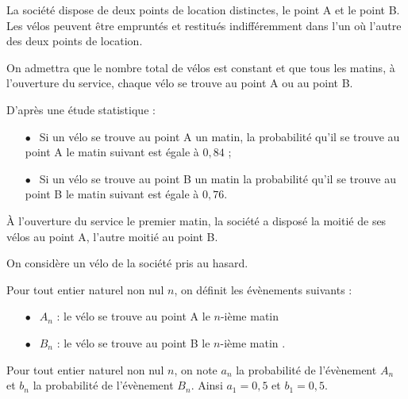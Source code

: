 \documentclass[10pt,a4paper]{article}
\begin{document}
La société dispose de deux points de location distinctes, le point A et le point B. Les vélos peuvent être empruntés et restitués indifféremment dans l'un où l'autre des deux points de location.

\smallskip

On admettra que le nombre total de vélos est constant et que tous les matins, à l'ouverture du service, chaque vélo se trouve au point A ou au point B.

\smallskip

D'après une étude statistique :

\smallskip

\setlength\parindent{1cm}
\begin{itemize}
\item[$\bullet~~$] Si un vélo se trouve au point A un matin, la probabilité qu'il se trouve au point A le matin suivant est égale à $0,84$ ;
\item[$\bullet~~$] Si un vélo se trouve au point B un matin la probabilité qu'il se trouve au point B le matin suivant est égale à $0,76$.
\end{itemize}
\setlength\parindent{0cm}

À l'ouverture du service le premier matin, la société a disposé la moitié de ses vélos au point A, l'autre moitié au point B.

\smallskip

On considère un vélo de la société pris au hasard.

\smallskip

Pour tout entier naturel non nul $n$, on définit les évènements suivants :

\setlength\parindent{1cm}
\begin{itemize}
\item[$\bullet~~$]$A_n$ : \og le vélo se trouve au point A le $n$-ième matin \fg{}
\item[$\bullet~~$]$B_n$ : \og le vélo se trouve au point B le $n$-ième matin \fg.
\end{itemize}
\setlength\parindent{0cm}

Pour tout entier naturel non nul $n$, on note $a_n$ la probabilité de l'évènement $A_n$ et $b_n$ la probabilité de l'évènement $B_n$. Ainsi $a_1 = 0,5$ et $b_1 =  0,5$.

\medskip
\end{document}
